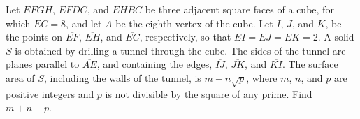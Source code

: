 Let $EFGH$, $EFDC$, and $EHBC$ be three adjacent square faces of a cube, for which $EC=8$, and let $A$ be the eighth vertex of the cube. Let $I$, $J$, and $K$, be the points on $\overline{EF}$, $\overline{EH}$, and $\overline{EC}$, respectively, so that $EI=EJ=EK=2$. A solid $S$ is obtained by drilling a tunnel through the cube. The sides of the tunnel are planes parallel to $\overline{AE}$, and containing the edges, $\overline{IJ}$, $\overline{JK}$, and $\overline{KI}$. The surface area of $S$, including the walls of the tunnel, is $m+n\sqrt{p}$, where $m$, $n$, and $p$ are positive integers and $p$ is not divisible by the square of any prime. Find $m+n+p$.